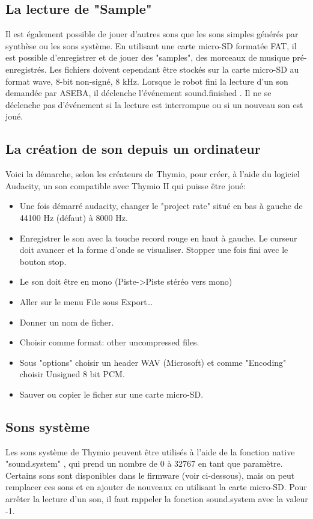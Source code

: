 \documentclass[a4paper, 12pt]{report}
\begin{document}
\subsection{La lecture de "Sample"}
Il est également possible de jouer d'autres sons que les sons simples générés par synthèse ou les sons système. En utilisant une carte micro-SD formatée FAT, il est possible d'enregistrer et de jouer des "samples", des morceaux de musique pré-enregistrés. Les fichiers doivent cependant être stockés sur la carte micro-SD au format wave, 8-bit non-signé, 8 kHz. Lorsque le robot fini la lecture d'un son demandée par ASEBA, il déclenche l'événement sound.finished . Il ne se déclenche pas d'événement si la lecture est interrompue ou si un nouveau son est joué.\\

\subsection{La création de son depuis un ordinateur}
Voici la démarche, selon les créateurs de Thymio, pour créer, à l'aide du logiciel Audacity, un son compatible avec Thymio II qui puisse être joué:\\
\begin{itemize}
\item Une fois démarré audacity, changer le "project rate" situé en bas à gauche de 44100 Hz (défaut) à 8000 Hz.
\item Enregistrer le son avec la touche record rouge en haut à gauche. Le curseur doit avancer et la forme d'onde se visualiser. Stopper une fois fini avec le bouton stop.
\item Le son doit être en mono (Piste->Piste stéréo vers mono)
\item Aller sur le menu File sous Export…
\item Donner un nom de ficher.
\item Choisir comme format: other uncompressed files.
\item Sous "options" choisir un header WAV (Microsoft) et comme "Encoding" choisir Unsigned 8 bit PCM.
\item Sauver ou copier le ficher sur une carte micro-SD.
\end{itemize}

\subsection{Sons système}
Les sons système de Thymio peuvent être utilisés à l'aide de la fonction native "sound.system" , qui prend un nombre de 0 à 32767 en tant que paramètre. Certains sons sont disponibles dans le firmware (voir ci-dessous), mais on peut remplacer ces sons et en ajouter de nouveaux en utilisant la carte micro-SD. Pour arrêter la lecture d'un son, il faut rappeler la fonction sound.system avec la valeur -1.
\end{document}
